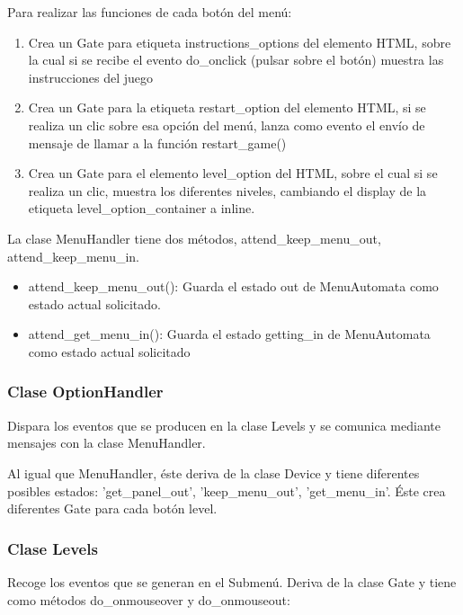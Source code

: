 Para realizar las funciones de cada botón del menú:
\begin{enumerate}
 \item Crea un Gate  para etiqueta instructions\_options del elemento HTML, sobre la cual si se recibe el 
evento do\_onclick (pulsar sobre el botón) muestra las instrucciones del juego

 \item Crea un Gate para la etiqueta restart\_option del elemento HTML, si se realiza un clic sobre esa opción del menú, lanza como evento el envío 
de mensaje de llamar a la función restart\_game()

 \item Crea un Gate para el elemento level\_option del HTML, sobre el cual si se realiza un clic,
muestra los diferentes niveles, cambiando el display de la etiqueta level\_option\_container a inline.
\end{enumerate}

La clase MenuHandler tiene dos métodos, attend\_keep\_menu\_out, attend\_keep\_menu\_in.
\begin{itemize}
 \item attend\_keep\_menu\_out(): Guarda el estado out de MenuAutomata como estado actual solicitado.

 \item attend\_get\_menu\_in(): Guarda el estado getting\_in de MenuAutomata como estado actual solicitado
\end{itemize}

\subsubsection{Clase OptionHandler}
\label{subsubsection:option_handler}

Dispara los eventos que se producen en la clase Levels y se comunica mediante mensajes con la clase MenuHandler.

Al igual que MenuHandler, éste deriva de la clase Device  y tiene diferentes posibles estados:
'get\_panel\_out', 'keep\_menu\_out', 'get\_menu\_in'.
Éste crea diferentes Gate para cada botón level.


\subsubsection{Clase Levels}
\label{subsubsection:levels}

Recoge los eventos que se generan en el Submenú. 
Deriva de la clase Gate y tiene como métodos do\_onmouseover y do\_onmouseout:

